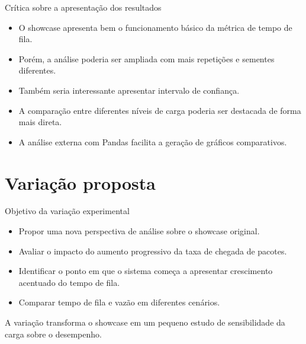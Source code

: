 \documentclass[aspectratio=169]{beamer}
\begin{document}
\begin{frame}{Crítica sobre a apresentação dos resultados}
\begin{itemize}
    \item O showcase apresenta bem o funcionamento básico da métrica de tempo de fila.
    \item Porém, a análise poderia ser ampliada com mais repetições e sementes diferentes.
    \item Também seria interessante apresentar intervalo de confiança.
    \item A comparação entre diferentes níveis de carga poderia ser destacada de forma mais direta.
    \item A análise externa com Pandas facilita a geração de gráficos comparativos.
\end{itemize}
\end{frame}

\section{Variação proposta}

\begin{frame}{Objetivo da variação experimental}
\begin{itemize}
    \item Propor uma nova perspectiva de análise sobre o showcase original.
    \item Avaliar o impacto do aumento progressivo da taxa de chegada de pacotes.
    \item Identificar o ponto em que o sistema começa a apresentar crescimento acentuado do tempo de fila.
    \item Comparar tempo de fila e vazão em diferentes cenários.
\end{itemize}

\begin{informacao}
A variação transforma o showcase em um pequeno estudo de sensibilidade da carga sobre o desempenho.
\end{informacao}
\end{frame}
\end{document}
